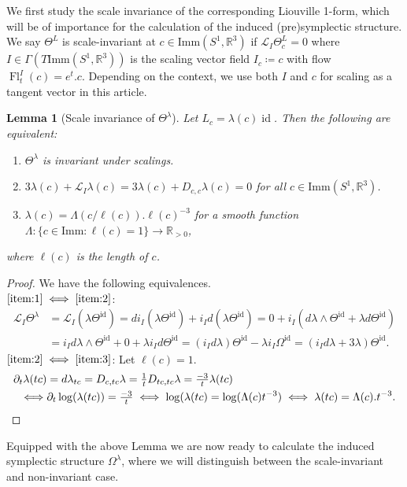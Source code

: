 \documentclass[12pt]{amsart}
\newcommand{\rev}[1]{#1}
\newtheorem{lemma}[theorem]{Lemma}
\theoremstyle{definition}
\newcommand{\R}{\mathbb R}
\newcommand{\id}{\mathrm{id}}
\newcommand{\Imm}{\mathrm{Imm}}
\def\la{\lambda}
\def\Th{\Theta}
\def\La{\Lambda}
\def\Om{\Omega}
\def\p{\partial}
\def\L{\mathcal{L}}
\def\R{{\mathbb R}}
\let\on=\operatorname
\begin{document}
We first study the scale invariance of the corresponding Liouville 1-form, which will be of importance for the calculation of the induced (pre)symplectic structure. We say $\Th^L$ is scale-invariant at $c\in \Imm(S^1,\R^3)$ if $\L_I \Th^L_c=0$ where $I\in \Gamma(T\Imm(S^1,\R^3))$ is the scaling vector field $I_c \coloneqq c$  with flow $\on{Fl}^I_t(c)= e^t.c$. Depending on the context, we use both $I$ and $c$ for scaling as a tangent vector in this article.
\begin{lemma}[Scale invariance of $\Th^\la$]
\label{prop:scale_invariance_of_conformal_Liouville}
    Let $L_c=\la(c)\operatorname{id}$. Then the following are equivalent:
    \begin{enumerate}[label=(\alph*)]
        \item \label{item:1} $\Th^\la$ is invariant under scalings.
        \item \label{item:2}$3\la(c) + \L_I\la(c)=3\la(c) + D_{c,c}\la\rev{(c)}=0$ for all $c\in \Imm(S^1,\R^3)$.
        \item \label{item:3} $\la(c) = \La(c/\ell(c)).\ell(c)^{-3}$ for a smooth function $\La: \{c\in \Imm:\ell(c)=1\}\to \mathbb R_{>0}$, 
    \end{enumerate}
    \rev{where $\ell(c)$ is the length of $c$.}
    \end{lemma}
\begin{proof} We have the following equivalences.
\\
$\ref{item:1}\iff \ref{item:2}$:
\begin{align}
       \L_I \Th^\la 
        &=\L_I (\la \Th^\id ) 
        = d i_I (\la \Th^\id ) +i_I d (\la \Th^\id ) 
        = 0 + i_I (d\la \wedge \Th^\id + \la d \Th^\id) \\
        &= i_I d\la \wedge \Th^\id +0 +  \la i_I d\Th^\id
        = (i_I d\la) \Th^\id -\la i_I \Om^\id = (i_I d\la +3\la)\Th^\id.
    \end{align}    
$ \ref{item:2}\iff \ref{item:3}$: Let $\ell(c)=1$.   
\begin{align}
    \p_t\la(tc) &=d\la_{tc}= D_{c,tc}\la = \tfrac1t D_{tc,tc}\la = \tfrac{-3}{t}\la(tc)
    \\\iff & \p_t\log(\la(tc)) = \tfrac{-3}{t} \iff \log(\la(tc)= \log(\La(c)t^{-3}) \iff \la(tc) = \La(c).t^{-3}. \qedhere
\end{align}
\end{proof}
Equipped with the above Lemma we are now ready to calculate the induced symplectic structure $\Omega^\la$, where we will distinguish between the scale-invariant and non-invariant case. 
\end{document}
